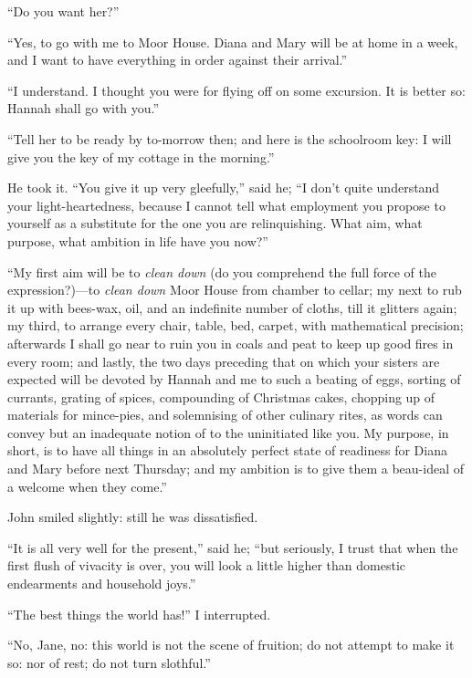 \enquote{Do you want her?}

\enquote{Yes, to go with me to Moor House. Diana and Mary will be at
	home in a week, and I want to have everything in order against their
	arrival.}

\enquote{I understand. I thought you were for flying off on some
	excursion. It is better so: Hannah shall go with you.}

\enquote{Tell her to be ready by to-morrow then; and here is the
	schoolroom key: I will give you the key of my cottage in the morning.}

He took it. \enquote{You give it up very gleefully,} said he;
\enquote{I don't quite understand your light-heartedness, because I
	cannot tell what employment you propose to yourself as a substitute for
	the one you are relinquishing. What aim, what purpose, what ambition in
	life have you now?}

\enquote{My first aim will be to \emph{clean down} (do you comprehend the full
	force of the expression?)---to \emph{clean down} Moor House from chamber
	to cellar; my next to rub it up with bees-wax, oil, and an indefinite
	number of cloths, till it glitters again; my third, to arrange every
	chair, table, bed, carpet, with mathematical precision; afterwards I
	shall go near to ruin you in coals and peat to keep up good fires in
	every room; and lastly, the two days preceding that on which your
	sisters are expected will be devoted by Hannah and me to such a beating
	of eggs, sorting of currants, grating of spices, compounding of
	Christmas cakes, chopping up of materials for mince-pies, and
	solemnising of other culinary rites, as words can convey but an
	inadequate notion of to the uninitiated like you. My purpose, in short,
	is to have all things in an absolutely perfect state of readiness for
	Diana and Mary before next Thursday; and my ambition is to give them a
	beau-ideal of a welcome when they come.}

\St{} John smiled slightly: still he was dissatisfied.

\enquote{It is all very well for the present,} said he; \enquote{but
	seriously, I trust that when the first flush of vivacity is over, you
	will look a little higher than domestic endearments and household joys.}

\enquote{The best things the world has!} I interrupted.

\enquote{No, Jane, no: this world is not the scene of fruition; do not
	attempt to make it so: nor of rest; do not turn slothful.}

